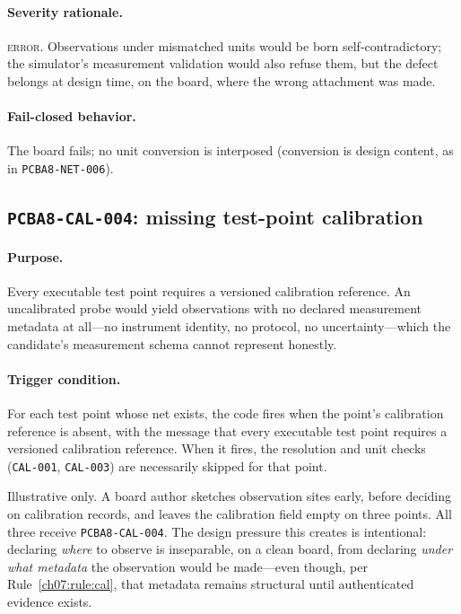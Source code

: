 \paragraph{Severity rationale.} \textsc{error}. Observations under mismatched units would be born self-contradictory; the simulator's measurement validation would also refuse them, but the defect belongs at design time, on the board, where the wrong attachment was made.

\paragraph{Fail-closed behavior.} The board fails; no unit conversion is interposed (conversion is design content, as in \texttt{PCBA8-NET-006}).

\subsection{\texttt{PCBA8-CAL-004}: missing test-point calibration}\label{ch07:sub:cal004}

\paragraph{Purpose.} Every executable test point requires a versioned calibration reference. An uncalibrated probe would yield observations with no declared measurement metadata at all---no instrument identity, no protocol, no uncertainty---which the candidate's measurement schema cannot represent honestly.

\paragraph{Trigger condition.} For each test point whose net exists, the code fires when the point's calibration reference is absent, with the message that every executable test point requires a versioned calibration reference. When it fires, the resolution and unit checks (\texttt{CAL-001}, \texttt{CAL-003}) are necessarily skipped for that point.

\begin{example}\label{ch07:ex:cal004}
Illustrative only. A board author sketches observation sites early, before deciding on calibration records, and leaves the calibration field empty on three points. All three receive \texttt{PCBA8-CAL-004}. The design pressure this creates is intentional: declaring \emph{where} to observe is inseparable, on a clean board, from declaring \emph{under what metadata} the observation would be made---even though, per Rule~\ref{ch07:rule:cal}, that metadata remains structural until authenticated evidence exists.
\end{example}

